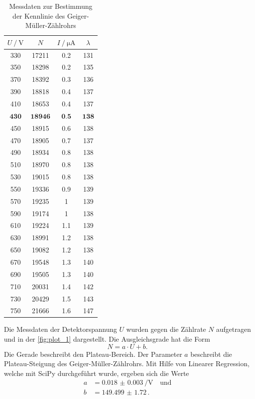 \begin{table}[H]
    \centering
    \caption{Messdaten zur Bestimmung der Kennlinie des Geiger-Müller-Zählrohrs}
    \label{tab:kennlinie}
\begin{tabular}{c c c c}
    \toprule
    $U \mathbin{/} \mathrm{V}$ & $N$ &  $I \mathbin{/} \unit{\micro\ampere}$ & $\lambda$\\
    \midrule
         330 &    17211 &   0.2 & 131\\
         350 &    18298 &   0.2 & 135\\
         370 &    18392 &   0.3 & 136\\
         390 &    18818 &   0.4 & 137\\
         410 &    18653 &   0.4 & 137\\
         $\textbf{430}$ &    $\textbf{18946}$ &   $\textbf{0.5}$ & $\textbf{138}$\\
         450 &    18915 &   0.6 & 138\\
         470 &    18905 &   0.7 & 137\\
         490 &    18934 &   0.8 & 138\\
         510 &    18970 &   0.8 & 138\\
         530 &    19015 &   0.8 & 138\\
         550 &    19336 &   0.9 & 139\\
         570 &    19235 &     1 & 139\\
         590 &    19174 &     1 & 138\\
         610 &    19224 &   1.1 & 139\\
         630 &    18991 &   1.2 & 138\\
         650 &    19082 &   1.2 & 138\\
         670 &    19548 &   1.3 & 140\\
         690 &    19505 &   1.3 & 140\\
         710 &    20031 &   1.4 & 142\\
         730 &    20429 &   1.5 & 143\\
         750 &    21666 &   1.6 & 147\\
    \bottomrule
    \end{tabular}
\end{table}


Die Messdaten der Detektorspannung $U$ wurden gegen die Zählrate $N$ aufgetragen und in der
\autoref{fig:plot_1} dargestellt. Die Ausgleichsgrade hat die Form
\begin{equation*}
    N = a \cdot U + b.
\end{equation*}
Die Gerade beschreibt den Plateau-Bereich. Der Parameter $a$ beschreibt die Plateau-Steigung des Geiger-Müller-Zählrohrs.
Mit Hilfe von Linearer Regression, welche mit SciPy \cite{scipy} durchgeführt wurde, ergeben sich die Werte
\begin{align*}
    a &= \qty{0.018(3)}{\per\volt} \quad \text{und} \\
    b &= \num{149.499(1720)} \, .
\end{align*}

